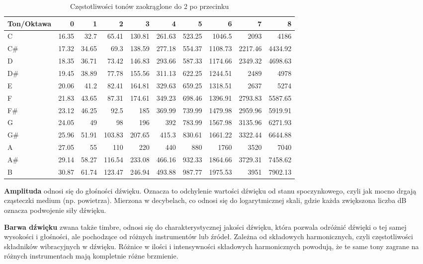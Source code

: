\begin{table}[H]
\centering
\caption{Częstotliwości tonów zaokrąglone do 2 po przecinku \cite{piano_key_frequencies}}
\label{tab:frequency}
\begin{tabular}{@{}lrrrrrrrrr@{}}
\toprule
Ton/Oktawa & 0    & 1    & 2     & 3      & 4       & 5       & 6        & 7        & 8        \\ \midrule
C          & 16.35 & 32.7 & 65.41 & 130.81 & 261.63 & 523.25 & 1046.5 & 2093 & 4186 \\
C\#        & 17.32 & 34.65 & 69.3 & 138.59 & 277.18 & 554.37 & 1108.73 & 2217.46 & 4434.92 \\
D          & 18.35 & 36.71 & 73.42 & 146.83 & 293.66 & 587.33 & 1174.66 & 2349.32 & 4698.63 \\
D\#        & 19.45 & 38.89 & 77.78 & 155.56 & 311.13 & 622.25 & 1244.51 & 2489 & 4978 \\
E          & 20.06 & 41.2 & 82.41 & 164.81 & 329.63 & 659.25 & 1318.51 & 2637 & 5274 \\
F          & 21.83 & 43.65 & 87.31 & 174.61 & 349.23 & 698.46 & 1396.91 & 2793.83 & 5587.65 \\
F\#        & 23.12 & 46.25 & 92.5 & 185 & 369.99 & 739.99 & 1479.98 & 2959.96 & 5919.91 \\
G          & 24.05 & 49 & 98 & 196 & 392 & 783.99 & 1567.98 & 3135.96 & 6271.93 \\
G\#        & 25.96 & 51.91 & 103.83 & 207.65 & 415.3 & 830.61 & 1661.22 & 3322.44 & 6644.88 \\
A          & 27.05 & 55 & 110 & 220 & 440 & 880 & 1760 & 3520 & 7040 \\
A\#        & 29.14 & 58.27 & 116.54 & 233.08 & 466.16 & 932.33 & 1864.66 & 3729.31 & 7458.62 \\
B          & 30.87 & 61.74 & 123.47 & 246.94 & 493.88 & 987.77 & 1975.53 & 3951 & 7902.13 \\ \bottomrule
\end{tabular}
\end{table}

\textbf{Amplituda} odnosi się do głośności dźwięku. Oznacza to odchylenie wartości dźwięku od stanu spoczynkowego, czyli jak mocno drgają cząsteczki medium (np. powietrza). Mierzona w decybelach, co odnosi się do logarytmicznej skali, gdzie każda zwiększona liczba dB oznacza podwojenie siły dźwięku.

\textbf{Barwa dźwięku} zwana także timbre, odnosi się do charakterystycznej jakości dźwięku, która pozwala odróżnić dźwięki o tej samej wysokości i głośności, ale pochodzące od różnych instrumentów lub źródeł. Zależna od składowych harmonicznych, czyli częstotliwości składników wibracyjnych w dźwięku. Różnice w ilości i intensywności składowych harmonicznych powodują, że te same tony zagrane na różnych instrumentach mają kompletnie różne brzmienie.

